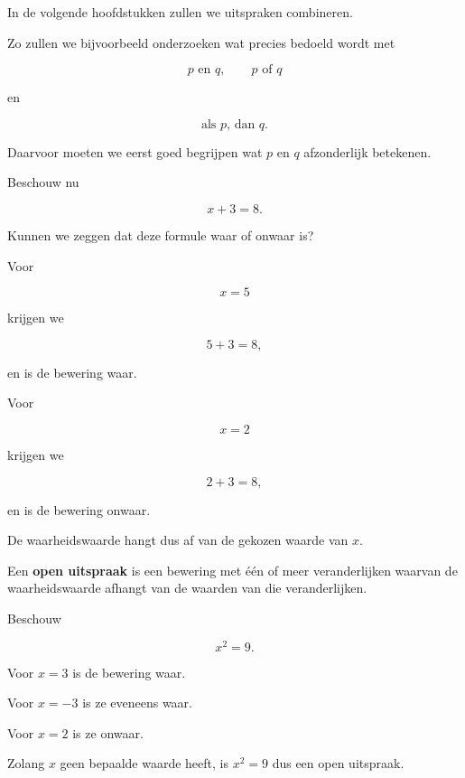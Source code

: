 \documentclass{ximera}
\begin{document}
\begin{opmerking}
In de volgende hoofdstukken zullen we uitspraken combineren.

Zo zullen we bijvoorbeeld onderzoeken wat precies bedoeld wordt met

\[
p\text{ en }q,
\qquad
p\text{ of }q
\]

en

\[
\text{als }p\text{, dan }q.
\]

Daarvoor moeten we eerst goed begrijpen wat $p$ en $q$ afzonderlijk
betekenen.
\end{opmerking}



Beschouw nu

\[
x+3=8.
\]

Kunnen we zeggen dat deze formule waar of onwaar is?

Voor

\[
x=5
\]

krijgen we

\[
5+3=8,
\]

en is de bewering waar.

Voor

\[
x=2
\]

krijgen we

\[
2+3=8,
\]

en is de bewering onwaar.

De waarheidswaarde hangt dus af van de gekozen waarde van $x$.


\begin{definitie}
Een \textbf{open uitspraak} is een bewering met één of meer
veranderlijken waarvan de waarheidswaarde afhangt van de waarden
van die veranderlijken.
\end{definitie}


\begin{voorbeeld}

Beschouw

\[
x^2=9.
\]

Voor $x=3$ is de bewering waar.

Voor $x=-3$ is ze eveneens waar.

Voor $x=2$ is ze onwaar.

Zolang $x$ geen bepaalde waarde heeft, is $x^2=9$ dus een open
uitspraak.
\end{voorbeeld}
\end{document}
